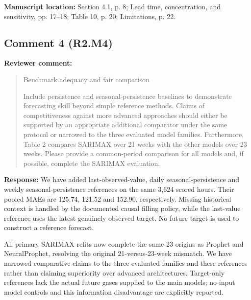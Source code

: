 \documentclass[11pt,a4paper]{article}
\begin{document}
\textbf{Manuscript location:} Section 4.1, p. 8; Lead time, concentration, and sensitivity, pp. 17--18; Table 10, p. 20; Limitations, p. 22.
\begin{samepage}
\subsection*{Comment 4 (R2.M4)}
\textbf{Reviewer comment:}
\begin{quote}\small Benchmark adequacy and fair comparison

Include persistence and seasonal-persistence baselines to demonstrate forecasting skill beyond simple reference methods. Claims of competitiveness against more advanced approaches should either be supported by an appropriate additional comparator under the same protocol or narrowed to the three evaluated model families. Furthermore, Table 2 compares SARIMAX over 21 weeks with the other models over 23 weeks. Please provide a common-period comparison for all models and, if possible, complete the SARIMAX evaluation.\end{quote}
\end{samepage}
\textbf{Response:}
We have added last-observed-value, daily seasonal-persistence and weekly seasonal-persistence references on the same 3,624 scored hours. Their pooled MAEs are 125.74, 121.52 and 152.90, respectively. Missing historical context is handled by the documented causal filling policy, while the last-value reference uses the latest genuinely observed target. No future target is used to construct a reference forecast.

All primary SARIMAX refits now complete the same 23 origins as Prophet and NeuralProphet, resolving the original 21-versus-23-week mismatch. We have narrowed comparative claims to the three evaluated families and these references rather than claiming superiority over advanced architectures. Target-only references lack the actual future gases supplied to the main models; no-input model controls and this information disadvantage are explicitly reported.
\end{document}
